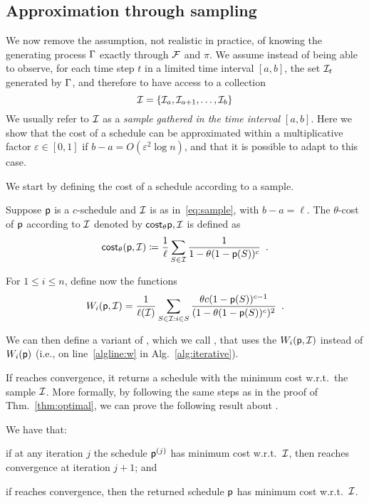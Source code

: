 \subsection{Approximation through sampling}\label{sec:sampcomp}
We now remove the assumption, not realistic in practice, of knowing the
generating process $\Gamma$ exactly through $\mathcal{F}$ and $\pi$. We assume
instead of being able to observe, for each time step $t$ in a limited time
interval $[a,b]$, the set $\mathcal{I}_t$ generated by $\Gamma$, and therefore to have
access to a collection
\begin{equation}\label{eq:sample}
	\mathcal{I}=\{\mathcal{I}_a,\mathcal{I}_{a+1},\dotsc,\mathcal{I}_b\}
\end{equation}
We usually refer to $\mathcal{I}$ as a \emph{sample gathered in the time interval
$[a,b]$}. Here we show that the cost of a schedule can be approximated within a
multiplicative factor $\varepsilon\in[0,1]$ if $b-a=O(\varepsilon^2\log n)$, and
that it is possible to adapt \algoname to this case.

We start by defining the cost of a schedule according to a sample.

\begin{definition}\label{def:costsample}
	Suppose $\mathsf{p}$ is a $c$-schedule and $\mathcal{I}$ is as in~\eqref{eq:sample},
	with $b-a=\ell$. The $\theta$-cost of $\mathsf{p}$ according to $\mathcal{I}$
	denoted by $\mathsf{cost}_\theta{\mathsf{p},\mathcal{I}}$ is defined as
	\[
		\mathsf{cost}_\theta(\mathsf{p},\mathcal{I})\coloneqq\frac{1}{\ell}\sum_{S\in \mathcal{I}}
		\frac{1}{1-\theta(1-\mathsf{p}(S))^c}\enspace.
	\]
\end{definition}

For $1\le i\le n$, define now the functions
\[
	W_i(\mathsf{p},\mathcal{I}) = \frac{1}{\ell(\mathcal{I})}\sum_{S\in \mathcal{I}: i\in S}
	\frac{\theta c (1-\mathsf{p}(S))^{c-1}}{(1-\theta(1-\mathsf{p}(S))^c)^2}\enspace.
\]

We can then define a variant of \algoname, which we call \algonameapx, that uses
the $W_i(\mathsf{p},\mathcal{I})$ instead of $W_i(\mathsf{p})$ (i.e., on
line~\ref{algline:w} in Alg.~\ref{alg:iterative}).

If \algonameapx reaches convergence, it returns a schedule with the minimum cost
w.r.t.~the sample $\mathcal{I}$. More formally, by following the same steps as in
the proof of Thm.~\ref{thm:optimal}, we can prove the following result about
\algonameapx.

\begin{lemma}\label{lem:optimal_sample}
	We have that:
	\begin{enumerate*}
		\item if at any iteration $j$ the schedule $\mathsf{p}^{(j)}$ has minimum
			cost w.r.t.~$\mathcal{I}$, then \algonameapx reaches convergence at
			iteration $j+1$; and
		\item if \algonameapx reaches convergence, then the returned schedule
			$\mathsf{p}$ has minimum cost w.r.t.~$\mathcal{I}$.
	\end{enumerate*}
\end{lemma}

